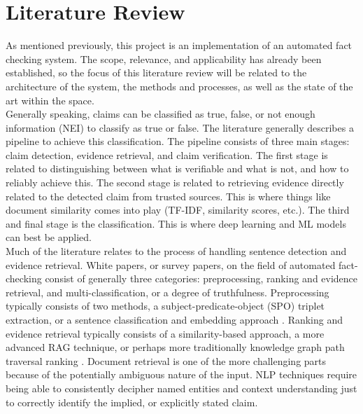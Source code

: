 \documentclass[11pt,letterpaper]{article}
\newcommand{\litreview}[1]{
    \section*{Literature Review}
    \addcontentsline{toc}{section}{Literature Review}
    #1
}
\begin{document}
\litreview{

    As mentioned previously, this project is an implementation of an automated fact checking system. The scope, relevance, and applicability has already been established, so the focus of this literature review will be related to the architecture of the system, the methods and processes, as well as the state of the art within the space. \\

    Generally speaking, claims can be classified as true, false, or not enough information (NEI) to classify as true or false. The literature generally describes a pipeline to achieve this classification. The pipeline consists of three main stages: claim detection, evidence retrieval, and claim verification. The first stage is related to distinguishing between what is verifiable and what is not, and how to reliably achieve this. The second stage is related to retrieving evidence directly related to the detected claim from trusted sources. This is where things like document similarity comes into play (TF-IDF, similarity scores, etc.). The third and final stage is the classification. This is where deep learning and ML models can best be applied. \\


    Much of the literature relates to the process of handling sentence detection and evidence retrieval.
    White papers, or survey papers, on the field of automated fact-checking consist of generally three
    categories: preprocessing, ranking and evidence retrieval, and multi-classification, or a degree of
    truthfulness. Preprocessing typically consists of two methods, a subject-predicate-object (SPO)
    triplet extraction, or a sentence classification and embedding approach \cite{automated_fact_check, afc_survey}. Ranking and evidence
    retrieval typically consists of a similarity-based approach, a more advanced RAG technique, or
    perhaps more traditionally knowledge graph path traversal ranking \cite{afc_survey, claimbuster}. Document retrieval is one
    of the more challenging parts because of the potentially ambiguous nature of the input. NLP
    techniques require being able to consistently decipher named entities and context understanding
    just to correctly identify the implied, or explicitly stated claim. \\

}
\end{document}

